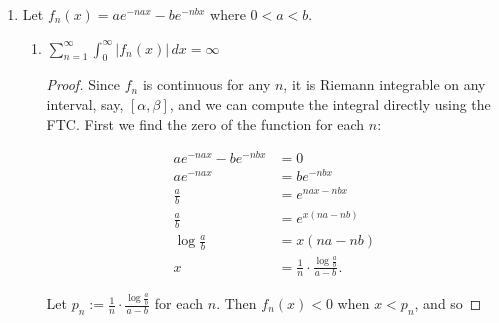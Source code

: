 \documentclass[11pt,oneside,english]{amsart}
\theoremstyle{definition}
\newcommand{\ve}{\varepsilon}
\begin{document}
\begin{enumerate}
\begin{proof}
\begin{align*}
|F(x)-F(x_0)|&=\left|\int_x^{x_0}f(t)\,dt\right|\\[2mm]
&=\left|\int f\cdot\mathbbm{1}_{[x,x_0]}\right|\\[2mm]
&\leq\int|f|\cdot\mathbbm{1}_{[x,x_0]}\\[2mm]
&\leq\int |f|\cdot\mathbbm{1}_{\left(x_0-\frac{\delta}{n},x_0+\frac{\delta}{n}\right)}\\[2mm]
&=\int f_n\\[2mm]
&=\left|\int f_n\right|\\[2mm]
&<\ve.
\end{align*}

Thus, $F$ is continuous by definition.
\end{proof}

\item Let $f_n(x)=ae^{-nax}-be^{-nbx}$ where $0<a<b$.

\vspace{5mm}
\begin{enumerate}
\itemsep5mm

\item $\displaystyle \sum_{n=1}^\infty\int_0^\infty|f_n(x)|\,dx=\infty$

\begin{proof}
Since $f_n$ is continuous for any $n$, it is Riemann integrable on any interval, say, $[\alpha,\beta]$, and we can compute the integral directly using the FTC. First we find the zero of the function for each $n$:

\begin{align*}
ae^{-nax}-be^{-nbx}&=0\\[2mm]
ae^{-nax}&=be^{-nbx}\\[2mm]
\frac{a}{b}&=e^{nax-nbx}\\[2mm]
\frac{a}{b}&=e^{x(na-nb)}\\[2mm]
\log \frac{a}{b}&=x(na-nb)\\[2mm]
x&=\frac{1}{n}\cdot\frac{\log \frac{a}{b}}{a-b}.
\end{align*}


Let $p_n:=\frac{1}{n}\cdot\frac{\log \frac{a}{b}}{a-b}$ for each $n$. Then $f_n(x)<0$ when $x<p_n$, and so


\end{proof}
\end{enumerate}
\end{enumerate}
\end{document}
